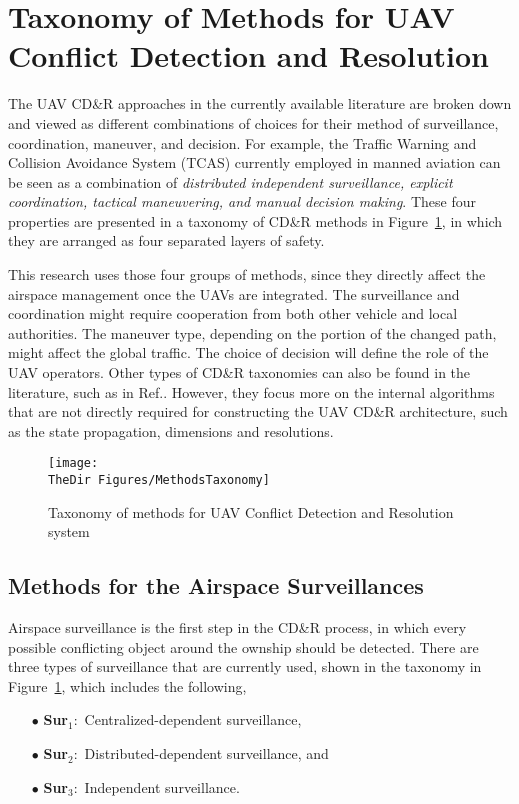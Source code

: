 \section{Taxonomy of Methods for UAV Conflict Detection and Resolution} 

The UAV CD\&R approaches in the currently available literature are broken down and viewed as different combinations of choices for their method of surveillance, coordination, maneuver, and decision. For example, the Traffic Warning and Collision Avoidance System (TCAS) currently employed in manned aviation can be seen as a combination of \textit{distributed independent surveillance, explicit coordination, tactical maneuvering, and manual decision making}. These four properties  are presented in a taxonomy of CD\&R methods in Figure~\ref{f:Taxonomy}, in which they are arranged as four separated layers of safety. 

This research uses those four groups of methods, since they directly affect the airspace management once the UAVs are integrated. The surveillance and coordination might require cooperation from both other vehicle and local authorities. The maneuver type, depending on the portion of the changed path, might affect the global traffic. The choice of decision will define the role of the UAV operators. Other types of CD\&R taxonomies can also be found in the literature, such as in Ref.\cite{Kuchar:00}. However, they focus more on the internal algorithms that are not directly required for constructing the UAV CD\&R architecture, such as the state propagation, dimensions and resolutions.

\begin{figure}[h]
	\centering  \texttt{[image: \\TheDir Figures/MethodsTaxonomy]}
	\caption{Taxonomy of methods for UAV Conflict Detection and Resolution system}
	\label{f:Taxonomy}
\end{figure}

\subsection{Methods for the Airspace Surveillances}
Airspace surveillance is the first step in the CD\&R process, in which every possible conflicting object around the ownship should be detected. There are three types of surveillance that are currently used, shown in the taxonomy in Figure~\ref{f:Taxonomy}, which includes the following,

\begin{itemize}[labelindent=\parindent,leftmargin=5pc]
	\item[$\bullet$ \textbf{Sur}$_1:$] Centralized-dependent surveillance,
	\item[$\bullet$ \textbf{Sur}$_2:$] Distributed-dependent surveillance, and
	\item[$\bullet$ \textbf{Sur}$_3:$] Independent surveillance.
\end{itemize}

